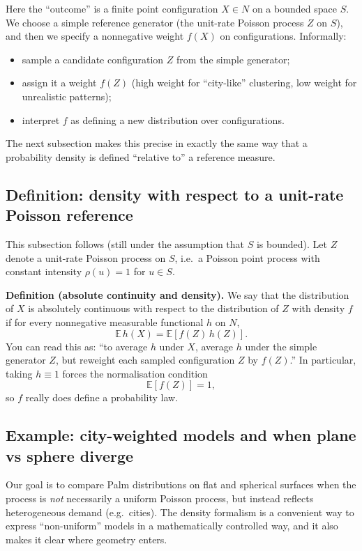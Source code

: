Here the ``outcome'' is a finite point configuration $X\in N$ on a bounded space $S$. We choose a simple reference
generator (the unit-rate Poisson process $Z$ on $S$), and then we specify a nonnegative weight $f(X)$ on configurations.
Informally:
\begin{itemize}
    \item sample a candidate configuration $Z$ from the simple generator;
    \item assign it a weight $f(Z)$ (high weight for ``city-like'' clustering, low weight for unrealistic patterns);
    \item interpret $f$ as defining a new distribution over configurations.
\end{itemize}
The next subsection makes this precise in exactly the same way that a probability density is defined ``relative to'' a
reference measure.

\subsection{Definition: density with respect to a unit-rate Poisson reference}
This subsection follows \cite{coeurjolly2017palm} (still under the assumption that $S$ is bounded).
Let $Z$ denote a unit-rate Poisson process on $S$, i.e.\ a Poisson point process with constant intensity $\rho(u)=1$ for
$u\in S$.

\noindent\textbf{Definition (absolute continuity and density).}
We say that the distribution of $X$ is absolutely continuous with respect to the distribution of $Z$ with density $f$ if
for every nonnegative measurable functional $h$ on $N$,
$$
\mathbb{E}\,h(X)=\mathbb{E}\!\left[f(Z)\,h(Z)\right].
$$
You can read this as: ``to average $h$ under $X$, average $h$ under the simple generator $Z$, but reweight each sampled
configuration $Z$ by $f(Z)$.'' In particular, taking $h\equiv 1$ forces the normalisation condition
$$
\mathbb{E}[f(Z)]=1,
$$
so $f$ really does define a probability law.

\subsection{Example: city-weighted models and when plane vs sphere diverge}
Our goal is to compare Palm distributions on flat and spherical surfaces when the process is \emph{not} necessarily a
uniform Poisson process, but instead reflects heterogeneous demand (e.g.\ cities). The density formalism is a convenient
way to express ``non-uniform'' models in a mathematically controlled way, and it also makes it clear where geometry enters.


